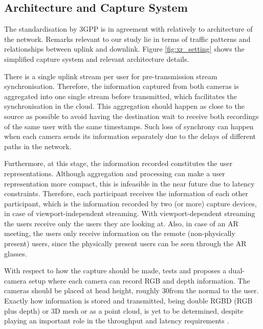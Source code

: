 \subsection*{Architecture and Capture System}

The standardisation by 3GPP \cite{3GPP_xr} is in agreement with \cite{multi_sensor_tno} relatively to architecture of the network. Remarks relevant to our study lie in terms of traffic patterns and relationships between uplink and downlink. Figure \ref{fig:xr_setting} shows the simplified capture system and relevant architecture details. 


There is a single uplink stream per user for pre-transmission stream synchronisation. Therefore, the information captured from both cameras is aggregated into one single stream before transmitted, which facilitates the synchronisation in the cloud. This aggregation should happen as close to the source as possible to avoid having the destination wait to receive both recordings of the same user with the same timestamps. Such loss of synchrony can happen when each camera sends its information separately due to the delays of different paths in the network.

Furthermore, at this stage, the information recorded constitutes the user representations. Although aggregation and processing can make a user representation more compact, this is infeasible in the near future due to latency constraints. Therefore, each participant receives the information of each other participant, which is the information recorded by two (or more) capture devices, in case of viewport-independent streaming. With viewport-dependent streaming the users receive only the users they are looking at. Also, in case of an \ac{AR} meeting, the users only receive information on the remote (non-physically present) users, since the physically present users can be seen through the AR glasses. 

With respect to how the capture should be made, \cite{double_rgb_tno} tests and proposes a dual-camera setup where each camera can record \ac{RGB} and depth information. The cameras should be placed at head height, roughly 30\tdeg from the normal to the user. Exactly how information is stored and transmitted, being double RGBD (RGB plus depth) or 3D mesh or as a point cloud, is yet to be determined, despite playing an important role in the throughput and latency requirements \cite{3GPP_xr}.


